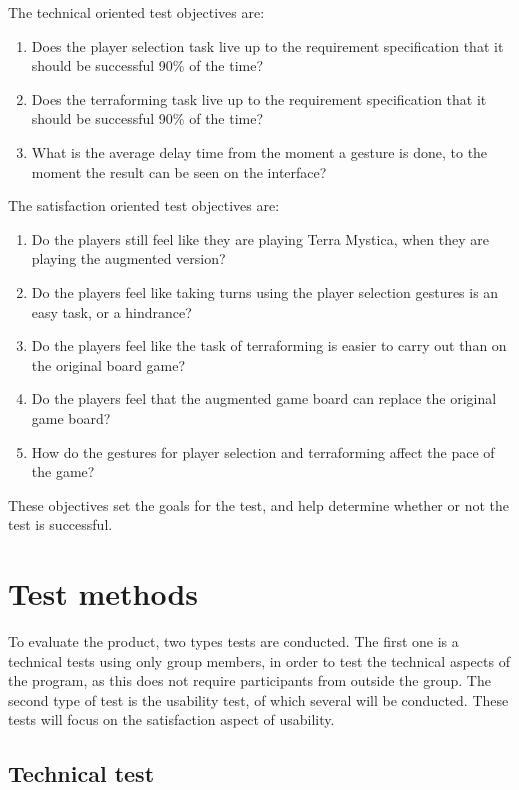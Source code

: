 The technical oriented test objectives are:
\begin{enumerate}
\item Does the player selection task live up to the requirement specification that it should be successful 90\% of the time?
\item Does the terraforming task live up to the requirement specification that it should be successful 90\% of the time?
\item What is the average delay time from the moment a gesture is done, to the moment the result can be seen on the interface?
\end{enumerate}
The satisfaction oriented test objectives are:
\begin{enumerate}
\item Do the players still feel like they are playing Terra Mystica, when they are playing the augmented version?
\item Do the players feel like taking turns using the player selection gestures is an easy task, or a hindrance?
\item Do the players feel like the task of terraforming is easier to carry out than on the original board game?
\item Do the players feel that the augmented game board can replace the original game board?
\item How do the gestures for player selection and terraforming affect the pace of the game?
\end{enumerate}

These objectives set the goals for the test, and help determine whether or not the test is successful. 

\section{Test methods}
To evaluate the product, two types tests are conducted. The first one is a technical tests using only group members, in order to test the technical aspects of the program, as this does not require participants from outside the group. The second type of test is the usability test, of which several will be conducted. These tests will focus on the satisfaction aspect of usability.

\subsection{Technical test}

